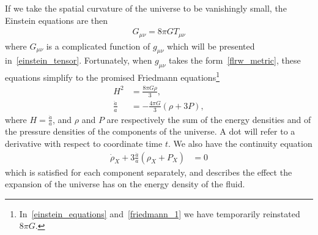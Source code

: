     If we take the spatial curvature of the universe to be vanishingly small,
    the Einstein equations are then
    \begin{align}\label{einstein_equations}
        G_{\mu\nu} = 8\pi G T_{\mu\nu}
    \end{align}
    where $G_{\mu\nu}$ is a complicated function of $g_{\mu\nu}$ which
    will be presented in~\eqref{einstein_tensor}.
    Fortunately, when $g_{\mu\nu}$ takes the form~\eqref{flrw_metric},
    these equations simplify to the promised Friedmann equations\footnote{
        In~\eqref{einstein_equations} and~\eqref{friedmann_1} we have temporarily reinstated $8\pi G$.}
    \begin{align}\label{friedmann_1}
        H^2 &= \frac{8\pi G \rho}{3},\\
        \frac{\ddot{a}}{a} &= -\frac{4\pi G}{3}\left(\rho+3P\right),
    \end{align}
    where $H=\frac{\dot{a}}{a}$, and $\rho$ and $P$ are respectively the sum of the
    energy densities and of the pressure densities of the
    components of the universe.
    A dot will refer to a derivative with respect to coordinate time $t$.
    We also have the continuity equation
    \begin{align}\label{continuity_equation}
        \dot{\rho}_X + 3\frac{\dot{a}}{a}\left(\rho_X+P_X\right) &= 0
    \end{align}
    which is satisfied for each component separately, and describes
    the effect the expansion of the universe has on the energy density of the fluid.

